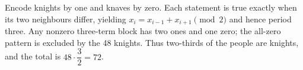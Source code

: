 Encode knights by one and knaves by zero. Each statement is true exactly when its two neighbours differ, yielding $x_i=x_{i-1}+x_{i+1}\pmod2$ and hence period three. Any nonzero three-term block has two ones and one zero; the all-zero pattern is excluded by the 48 knights. Thus two-thirds of the people are knights, and the total is $48\cdot\dfrac{3}{2}=\boxed{72}$.
